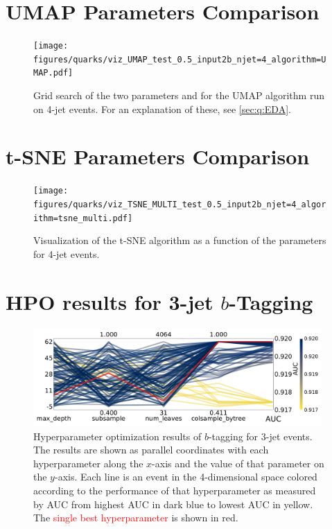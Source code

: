 \clearpage

\section{UMAP Parameters Comparison}
\begin{figure}[h!]
  \centerfloat
  \texttt{[image: figures/quarks/viz\_UMAP\_test\_0.5\_input2b\_njet=4\_algorithm=UMAP.pdf]}
  \caption[UMAP Parameter Grid Search]
          {Grid search of the two parameters  and  for the UMAP algorithm run on 4-jet events. For an explanation of these, see \autoref{sec:q:EDA}.} 
  \label{fig:q:UMAP_vertex_all_4j}
\end{figure}


\FloatBarrier
\section{t-SNE Parameters Comparison}

\begin{figure}[h!]
  \centerfloat
  \texttt{[image: figures/quarks/viz\_TSNE\_MULTI\_test\_0.5\_input2b\_njet=4\_algorithm=tsne\_multi.pdf]}
  \caption[Visualization of the t-SNE algorithm]
          {Visualization of the t-SNE algorithm as a function of the  parameters for 4-jet events.} 
  \label{fig:q:tsne_vertex}
\end{figure}
\clearpage




\FloatBarrier
\section[HPO results for 3-jet b-Tagging]{HPO results for 3-jet $b$-Tagging}
\begin{figure}
  \includegraphics[width=0.98\textwidth, trim=0 0 0 0, clip]{figures/quarks/CV_viz-njet=3-name=lf_lgb_down_sample=1.00-ML_vars=vertex-selection=b-ejet_min=4-n_iter_RS_lgb=99-n_iter_RS_xgb=9-cdot_cut=0.90-version=19.pdf}
  \caption[Parallel Coordinate Plot of HPO results for 3-Jet $b$-Tagging]
          {Hyperparameter optimization results of $b$-tagging for 3-jet events. The results are shown as parallel coordinates with each hyperparameter along the $x$-axis and the value of that parameter on the $y$-axis. Each line is an event in the 4-dimensional space colored according to the performance of that hyperparameter as measured by AUC from \textcolor{viridis-dark}{highest} AUC in dark blue to \textcolor{viridis-light}{lowest} AUC in yellow. The \textcolor{red}{single best hyperparameter} is shown in red. 
          } 
  \label{fig:q:initial_CV_res_parallel_coords_3j}
\end{figure}
\vspace{5cm}

